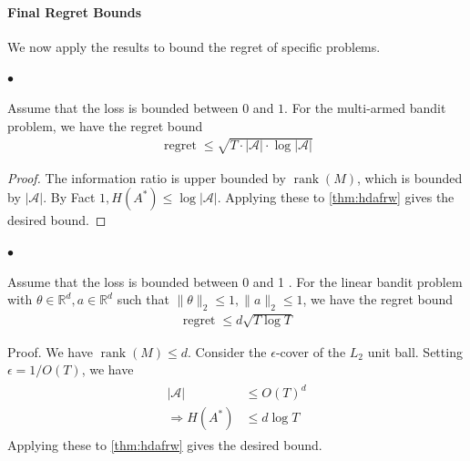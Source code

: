 \documentclass{article}
\newcommand{\re}{\operatorname{regret}}
\begin{document}
\paragraph{Final Regret Bounds}
We now apply the results to bound the regret of specific problems.

$\bullet$ 
\begin{cora}
  Assume that the loss is bounded between 0 and $1 .$ For the multi-armed bandit problem, we have the regret bound
\begin{align*}
\re \leq \sqrt{T \cdot|\mathcal{A}| \cdot \log |\mathcal{A}|}
\end{align*}
\end{cora} 
\begin{proof}
The information ratio is upper bounded by $\operatorname{rank}(M)$, which is bounded by $|\mathcal{A}|$. By Fact $1, H\left(A^{*}\right) \leq \log |\mathcal{A}| .$ Applying these to \cref{thm:hdafrw} gives the desired bound.
\end{proof} 

$\bullet$ 
\begin{cora}
  Assume that the loss is bounded between 0 and 1 . For the linear bandit problem with $\theta \in \mathbb{R}^{d}, a \in \mathbb{R}^{d}$ such that $\|\theta\|_{2} \leq 1,\|a\|_{2} \leq 1$, we have the regret bound
\begin{align*}
\re\leq d \sqrt{T \log T}
\end{align*}
\end{cora} 
Proof. We have $\operatorname{rank}(M) \leq d$. Consider the $\epsilon$-cover of the $L_{2}$ unit ball. Setting $\epsilon=1 / O(T)$, we have
\begin{align*}
\begin{aligned}
|\mathcal{A}| & \leq O(T)^{d} \\
\Rightarrow H\left(A^{*}\right) & \leq d \log T
\end{aligned}
\end{align*}
Applying these to \cref{thm:hdafrw} gives the desired bound.



\end{document}
